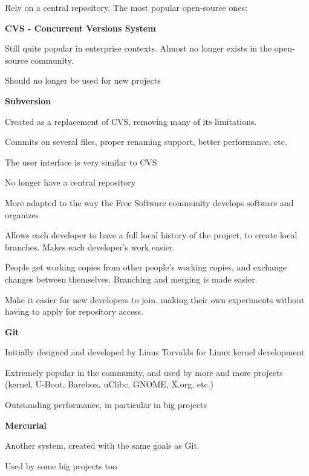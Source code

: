   Rely on a central
  repository. The most popular open-source ones:
  \startitemize
  \item {\bf CVS - Concurrent Versions System}
    \startitemize
    \item Still quite popular in enterprise contexts. Almost no longer
      exists in the open-source community.
    \item Should no longer be used for new projects
    \item
    \stopitemize
  \item {\bf Subversion}
    \startitemize
    \item Created as a replacement of CVS, removing many of its
      limitations.
    \item Commits on several files, proper renaming support, better
      performance, etc.
    \item The user interface is very similar to CVS
    \item {}
    \stopitemize
  \stopitemize

  No longer have a central repository
  \startitemize
  \item More adapted to the way the Free Software community develops
    software and organizes
  \item Allows each developer to have a full local history of the
    project, to create local branches. Makes each developer's work
    easier.
  \item People get working copies from other people's working copies,
    and exchange changes between themselves. Branching and merging is
    made easier.
  \item Make it easier for new developers to join, making their own
    experiments without having to apply for repository access.
  \stopitemize

  \startitemize
  \item {\bf Git}
    \startitemize
    \item Initially designed and developed by Linus Torvalds for Linux
      kernel development
    \item Extremely popular in the community, and used by more and
      more projects (kernel, U-Boot, Barebox, uClibc, GNOME, X.org,
      etc.)
    \item Outstanding performance, in particular in big projects
    \item {}
    \stopitemize
  \item {\bf Mercurial}
    \startitemize
    \item Another system, created with the same goals as Git.
    \item Used by some big projects too
    \item {}
    \stopitemize
  \stopitemize


